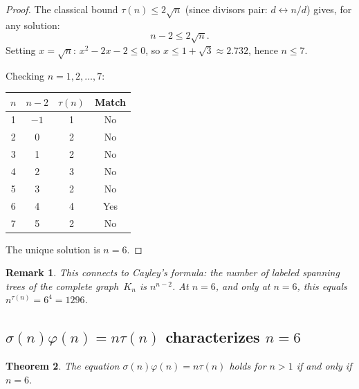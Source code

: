 \documentclass{amsart}
\newtheorem{theorem}{Theorem}[section]
\newtheorem{remark}[theorem]{Remark}
\begin{document}
\begin{proof}
The classical bound $\tau(n) \leq 2\sqrt{n}$ (since divisors pair: $d \leftrightarrow n/d$) gives, for any solution:
\[
n - 2 \leq 2\sqrt{n}.
\]
Setting $x = \sqrt{n}$: $x^2 - 2x - 2 \leq 0$, so $x \leq 1 + \sqrt{3} \approx 2.732$, hence $n \leq 7$.

Checking $n = 1, 2, \ldots, 7$:

\begin{center}
\begin{tabular}{cccc}
\toprule
$n$ & $n - 2$ & $\tau(n)$ & Match \\
\midrule
1 & $-1$ & 1 & No \\
2 & 0 & 2 & No \\
3 & 1 & 2 & No \\
4 & 2 & 3 & No \\
5 & 3 & 2 & No \\
6 & 4 & 4 & Yes \\
7 & 5 & 2 & No \\
\bottomrule
\end{tabular}
\end{center}

The unique solution is $n = 6$.
\end{proof}

\begin{remark}
This connects to Cayley's formula: the number of labeled spanning trees of the complete graph~$K_n$ is $n^{n-2}$. At $n = 6$, and only at $n = 6$, this equals $n^{\tau(n)} = 6^4 = 1296$.
\end{remark}

\subsection{$\sigma(n)\varphi(n) = n\tau(n)$ characterizes $n = 6$}

\begin{theorem}\label{thm:sigma-phi-tau}
The equation $\sigma(n)\varphi(n) = n\tau(n)$ holds for $n > 1$ if and only if $n = 6$.
\end{theorem}
\end{document}
